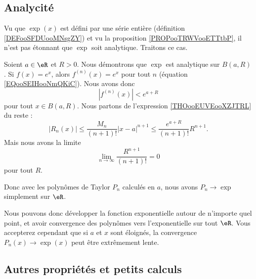\subsection{Analycité}

Vu que \( \exp(x)\) est défini par une série entière (définition \ref{DEFooSFDUooMNsgZY}) et vu la proposition \ref{PROPooTRWVooETTtbP}, il n'est pas étonnant que \( \exp\) soit analytique. Traitons ce cas.

\begin{example}
   Soient \( a\in \eR\) et \( R>0\). Nous démontrons que \( \exp\) est analytique sur \( B(a,R)\). Si \( f(x)= e^{x}\), alors \( f^{(n)}(x)= e^{x}\) pour tout \( n\) (équation \eqref{EQooSEIHooNmQKiC}). Nous avons donc
   \begin{equation}
       | f^{(n)}(x) |< e^{a+R}
   \end{equation}
   pour tout \( x\in B(a,R)\). Nous partons de l'expression \eqref{THOooEUVEooXZJTRL} du reste :
   \begin{equation}
       | R_n(x) |\leq \frac{ M_n }{ (n+1)! }| x-a |^{n+1}\leq \frac{  e^{a+R} }{ (n+1)! }R^{n+1}.
   \end{equation}
   Mais nous avons la limite 
   \begin{equation}
       \lim_{n\to \infty} \frac{ R^{n+1} }{ (n+1)! }=0
   \end{equation}
   pour tout \( R\). 

   Donc avec les polynômes de Taylor \( P_n\) calculés en \( a\), nous avons \( P_n\to \exp\) simplement sur \( \eR\).

   Nous pouvons donc développer la fonction exponentielle autour de n'importe quel point, et avoir convergence des polynômes vers l'exponentielle sur tout \( \eR\). Vous accepterez cependant que si \( a\) et \( x\) sont éloignés, la convergence \( P_n(x)\to \exp(x)\) peut être extrêmement lente.
\end{example}

\subsection{Autres propriétés et petits calculs}

